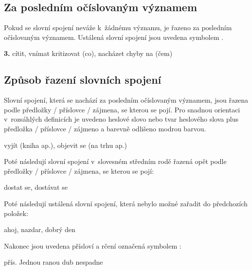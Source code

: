 \subsection*{Za posledním očíslovaným významem}

Pokud se slovní spojení neváže k~žádnému významu, je řazeno za posledním očíslovaným významem. Ustálená slovní spojení jsou uvedena symbolem \dicsymIdiom.

\blspace
  \dicEntry {}   {\textbf{3.}} {cítit, vnímat}  {kritizovat (co), nacházet chyby na (čem)}
\blspace

\subsection*{Způsob řazení slovních spojení}

Slovní spojení, která se nachází za posledním očíslovaným významem, jsou řazena podle předložky / příslovce / zájmena, se kterou se pojí. Pro snadnou orientaci v~rozsáhlých definicích je uvedeno heslové slovo nebo tvar heslového slova plus předložka / příslovce / zájmeno a barevně odlišeno modrou barvou.

\blspace
  \dicEntry {}    {vyjít (kniha ap.), objevit se (na trhu ap.)}
\blspace

Poté následují slovní spojení v~slovesném středním rodě řazená opět podle předložky / příslovce / zájmena, se kterou se pojí:

\blspace
  \dicEntry {}     {dostat se, dostávat se}
\blspace

Poté následují ustálená slovní spojení, která nebylo možné zařadit do předchozích položek:

\blspace
  \dicEntry {}    {ahoj, nazdar, dobrý den}
\blspace

Nakonec jsou uvedena přísloví a rčení označená symbolem \dicsymProverb:

\blspace
  \dicEntry {}    {\footnotesize{přís.}} {Jednou ranou dub nespadne}
\blspace

